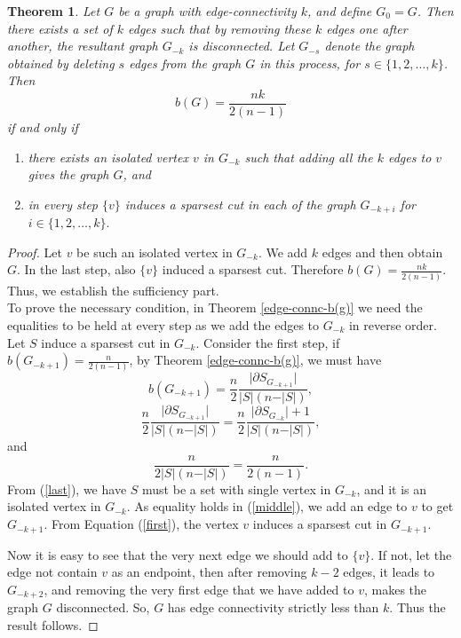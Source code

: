 \documentclass[12pt]{article}
\newtheorem{theorem}{Theorem}[section]
\begin{document}
\begin{theorem}\label{edge-connc-b(g)-equi-chara}
   Let $G$ be a graph with edge-connectivity $k$, and define $G_0=G$. Then there exists a set of $k$ edges such that by removing these  $k$ edges one after another, the resultant graph $G_{-k}$ is disconnected. Let $G_{-s}$ denote the graph obtained by deleting $s$ edges from the graph $G$ in this process, for $s \in \{1,2,\dots,k\}$. Then  \begin{equation*}
b(G) = \frac{nk}{2(n-1)}
\end{equation*} if and only if 
\begin{enumerate}
    \item[(a)] there exists an isolated vertex $v$ in $G_{-k}$ such that adding all the $k$ edges to $v$ gives the graph $G$, and 
    \item[(b)] in every step $\{v\}$ induces a sparsest cut in each of the graph $G_{-k+i}$ for $i \in \{1,2,\dots,k\}.$
\end{enumerate}
\end{theorem}

\begin{proof}
Let $v$ be such an isolated vertex in $G_{-k}$. We add $k$ edges and then obtain $G$. In the last step, also $\{v\}$ induced a sparsest cut.
Therefore $b(G)=\frac{nk}{2(n-1)}$. Thus, we establish the sufficiency part.\\
To prove the necessary condition, in Theorem \ref{edge-connc-b(g)} we need the equalities to be held at every step as we add the edges to $G_{-k}$ in   reverse order. Let $S$ induce a sparsest cut in $G_{-k}$. Consider the first step, if $b(G_{-k+1})=\frac{n}{2(n-1)}$, by Theorem \ref{edge-connc-b(g)}, we must have
\begin{equation}\label{first}
    b(G_{-k+1})= \frac{n}{2} \frac{\vert\partial S_{G_{-k+1}}\vert}{\vert S\vert(n-\vert S \vert)},
\end{equation}
\begin{equation}\label{middle}
    \frac{n}{2} \frac{\vert\partial S_{G_{-k+1}}\vert}{\vert S\vert(n-\vert S \vert)} = \frac{n}{2} \frac{\vert \partial S_{G_{-k} }\vert+1}{\vert S \vert (n-\vert S \vert)},
\end{equation}
and 
\begin{equation}\label{last}
   \frac{n}{2\vert S \vert (n-\vert S\vert )} =  \frac{n}{2(n-1)}.
\end{equation}
 From (\ref{last}), we have $S$ must be a set with single vertex in $G_{-k}$, and it is an isolated vertex in $G_{-k}$. As equality holds in  (\ref{middle}), we add an edge to $v$ to get $G_{-k+1}$. From Equation (\ref{first}), the vertex $v$ induces a sparsest cut in $G_{-k+1}$.
 
Now it is easy to see that the very next edge we should add to $\{v\}$. If not, let the edge not contain $v$ as an endpoint, then after removing $k-2$ edges, it leads to $G_{-k+2}$, and removing the very first edge that we have added to $v$, makes the graph $G$ disconnected. So, $G$ has edge connectivity strictly less than $k$. Thus the result follows.
\end{proof}
\end{document}
